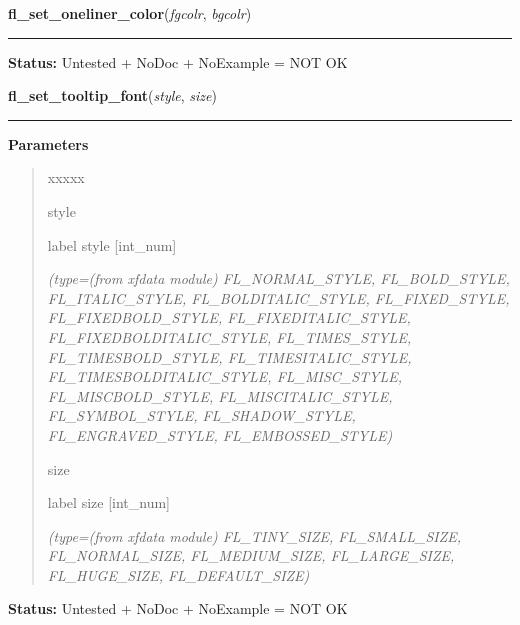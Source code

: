 \hspace{.8\funcindent}\begin{boxedminipage}{\funcwidth}

    \raggedright \textbf{fl\_set\_oneliner\_color}(\textit{fgcolr}, \textit{bgcolr})

    \vspace{-1.5ex}

    \rule{\textwidth}{0.5\fboxrule}
\setlength{\parskip}{2ex}
\setlength{\parskip}{1ex}
\textbf{Status:} Untested + NoDoc + NoExample = NOT OK



    \end{boxedminipage}

    \label{xformslib:library:fl_set_tooltip_font}

    \vspace{0.5ex}

\hspace{.8\funcindent}\begin{boxedminipage}{\funcwidth}

    \raggedright \textbf{fl\_set\_tooltip\_font}(\textit{style}, \textit{size})

    \vspace{-1.5ex}

    \rule{\textwidth}{0.5\fboxrule}
\setlength{\parskip}{2ex}
\setlength{\parskip}{1ex}
      \textbf{Parameters}
      \vspace{-1ex}

      \begin{quote}
        \begin{Ventry}{xxxxx}

          \item[style]

          label style [int\_num]

            {\it (type=(from xfdata module) FL\_NORMAL\_STYLE, FL\_BOLD\_STYLE, FL\_ITALIC\_STYLE,
FL\_BOLDITALIC\_STYLE, FL\_FIXED\_STYLE, FL\_FIXEDBOLD\_STYLE, 
FL\_FIXEDITALIC\_STYLE, FL\_FIXEDBOLDITALIC\_STYLE, FL\_TIMES\_STYLE, 
FL\_TIMESBOLD\_STYLE, FL\_TIMESITALIC\_STYLE, FL\_TIMESBOLDITALIC\_STYLE, 
FL\_MISC\_STYLE, FL\_MISCBOLD\_STYLE, FL\_MISCITALIC\_STYLE, 
FL\_SYMBOL\_STYLE, FL\_SHADOW\_STYLE, FL\_ENGRAVED\_STYLE, 
FL\_EMBOSSED\_STYLE)}

          \item[size]

          label size [int\_num]

            {\it (type=(from xfdata module) FL\_TINY\_SIZE, FL\_SMALL\_SIZE, FL\_NORMAL\_SIZE, 
FL\_MEDIUM\_SIZE, FL\_LARGE\_SIZE, FL\_HUGE\_SIZE, FL\_DEFAULT\_SIZE)}

        \end{Ventry}

      \end{quote}

\textbf{Status:} Untested + NoDoc + NoExample = NOT OK



    \end{boxedminipage}

